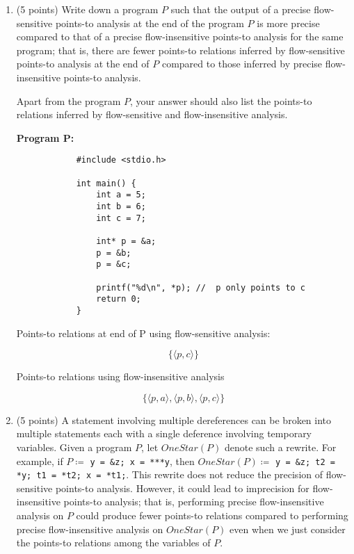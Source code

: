 \documentclass[12pt]{article}
\begin{document}
\begin{enumerate}
        \item (5 points) Write down a program $P$ such that the output of a precise
        flow-sensitive points-to analysis at the end of the program $P$ is more
        precise compared to that of a precise flow-insensitive points-to
        analysis for the same program; that is, there are fewer points-to relations 
        inferred by flow-sensitive points-to analysis at the end of $P$ compared 
        to those inferred by precise flow-insensitive points-to analysis.
        
        Apart from the program $P$, your answer should also list the points-to 
        relations inferred by flow-sensitive and flow-insensitive analysis.
        
     \vspace{12em}

        \begin{mdframed}
         
           \textbf{Program P:}
            \begin{lstlisting}
            #include <stdio.h>
            
            int main() {
                int a = 5;
                int b = 6;
                int c = 7;
            
                int* p = &a;
                p = &b;
                p = &c;
            
                printf("%d\n", *p); //  p only points to c
                return 0;
            }
            \end{lstlisting}
          Points-to relations at end of P using flow-sensitive analysis:

        \[
        \{ \langle p, c \rangle \}
        \]

          Points-to relations using flow-insensitive analysis

         \[
        \{ \langle p, a \rangle, \langle p, b \rangle, \langle p, c \rangle \}
        \]

        \end{mdframed}

      \item (5 points) A statement involving multiple dereferences can be broken
      into multiple statements each with a single deference involving temporary
      variables. Given a program $P$, let $OneStar(P)$ denote such a rewrite.
      For example, if $P \coloneqq$ \lstinline$y = &z; x = ***y$, then
      $OneStar(P) \coloneqq $ \lstinline$y = &z; t2 = *y; t1 = *t2; x = *t1;$.
      This rewrite does not reduce the precision of flow-sensitive points-to
      analysis. However, it could lead to imprecision for flow-insensitive
      points-to analysis; that is, performing precise flow-insensitive analysis
      on $P$ could produce fewer points-to relations compared to performing
      precise flow-insensitive analysis on $OneStar(P)$ even when we just
      consider the points-to relations among the variables of $P$.


\end{enumerate}
\end{document}
